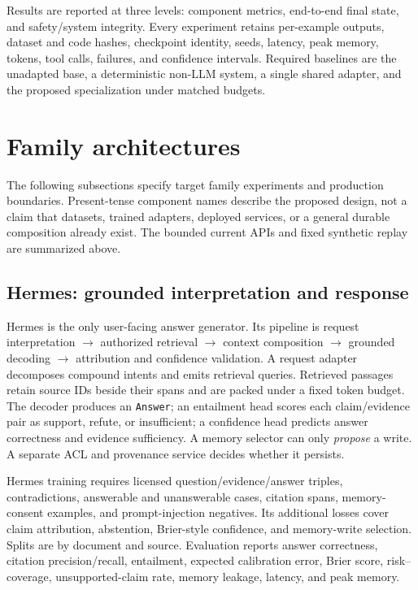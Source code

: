 \documentclass[10pt]{article}
\begin{document}
Results are reported at three levels: component metrics, end-to-end final state,
and safety/system integrity. Every experiment retains per-example outputs,
dataset and code hashes, checkpoint identity, seeds, latency, peak memory,
tokens, tool calls, failures, and confidence intervals. Required baselines are
the unadapted base, a deterministic non-LLM system, a single shared adapter, and
the proposed specialization under matched budgets.

\section{Family architectures}

The following subsections specify target family experiments and production
boundaries. Present-tense component names describe the proposed design, not a
claim that datasets, trained adapters, deployed services, or a general durable
composition already exist. The bounded current APIs and fixed synthetic replay
are summarized above.

\subsection{Hermes: grounded interpretation and response}

Hermes is the only user-facing answer generator. Its pipeline is request
interpretation $\rightarrow$ authorized retrieval $\rightarrow$ context
composition $\rightarrow$ grounded decoding $\rightarrow$ attribution and
confidence validation. A request adapter decomposes compound intents and emits
retrieval queries. Retrieved passages retain source IDs beside their spans and
are packed under a fixed token budget. The decoder produces an
\texttt{Answer}; an entailment head scores each claim/evidence pair as support,
refute, or insufficient; a confidence head predicts answer correctness and
evidence sufficiency. A memory selector can only \emph{propose} a write. A
separate ACL and provenance service decides whether it persists.

Hermes training requires licensed question/evidence/answer triples,
contradictions, answerable and unanswerable cases, citation spans,
memory-consent examples, and prompt-injection negatives. Its additional losses
cover claim attribution, abstention, Brier-style confidence, and memory-write
selection. Splits are by document and source. Evaluation reports answer
correctness, citation precision/recall, entailment, expected calibration error,
Brier score, risk--coverage, unsupported-claim rate, memory leakage, latency,
and peak memory.
\end{document}
